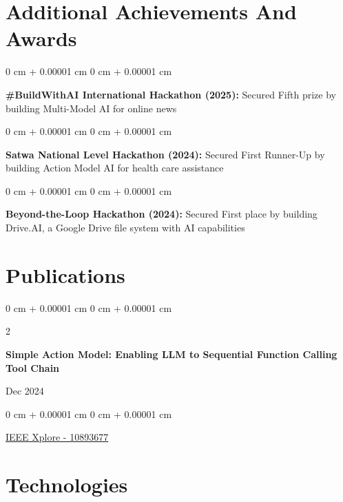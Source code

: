 \documentclass[10pt, letterpaper]{article}
\newenvironment{onecolentry}{
    \begin{adjustwidth}{
        0 cm + 0.00001 cm
    }{
        0 cm + 0.00001 cm
    }
}{
    \end{adjustwidth}
} %
\newenvironment{twocolentry}[2][]{
    \onecolentry
    \def\secondColumn{#2}
    \setcolumnwidth{\fill, 4.5 cm}
    \begin{paracol}{2}
}{
    \switchcolumn \raggedleft \secondColumn
    \end{paracol}
    \endonecolentry
} %
\begin{document}
\section{Additional Achievements And Awards}

\vspace{0.2 cm}
\begin{onecolentry}
	\textbf{\#BuildWithAI International Hackathon (2025):} Secured Fifth prize by building Multi-Model AI for online news
\end{onecolentry}

\vspace{0.2 cm}
\begin{onecolentry}
	\textbf{Satwa National Level Hackathon (2024):} Secured First Runner-Up by building Action Model AI for health care assistance
\end{onecolentry}

\vspace{0.2 cm}

\begin{onecolentry}
	\textbf{Beyond-the-Loop Hackathon (2024):} Secured First place by building Drive.AI, a Google Drive file system with AI capabilities
\end{onecolentry}

\section{Publications}

\begin{samepage}
	\begin{twocolentry}{
			Dec 2024
		}
		\textbf{Simple Action Model: Enabling LLM to Sequential Function Calling Tool Chain}
	\end{twocolentry}

	\vspace{0.10 cm}

	\begin{onecolentry}

		\vspace{0.10 cm}

		\href{https://ieeexplore.ieee.org/document/10893677}{IEEE Xplore - 10893677}
	\end{onecolentry}
\end{samepage}

\section{Technologies}
\end{document}
